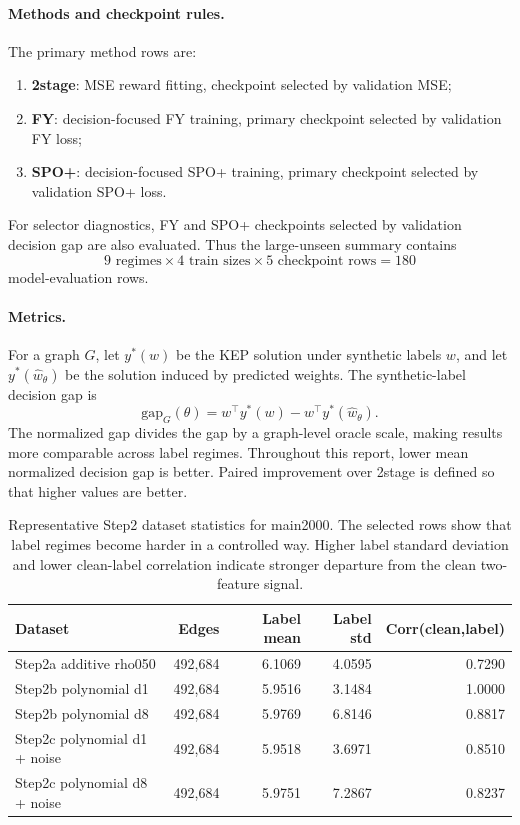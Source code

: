 \documentclass[11pt]{article}
\newcommand{\gap}{\mathrm{gap}}
\begin{document}
\paragraph{Methods and checkpoint rules.}
The primary method rows are:
\begin{enumerate}
  \item \textbf{2stage}: MSE reward fitting, checkpoint selected by validation MSE;
  \item \textbf{FY}: decision-focused FY training, primary checkpoint selected by validation FY loss;
  \item \textbf{SPO+}: decision-focused SPO+ training, primary checkpoint selected by validation SPO+ loss.
\end{enumerate}
For selector diagnostics, FY and SPO+ checkpoints selected by validation decision gap are also evaluated. Thus the large-unseen summary contains
\[
  9\text{ regimes}\times 4\text{ train sizes}\times 5\text{ checkpoint rows}=180
\]
model-evaluation rows.

\paragraph{Metrics.}
For a graph \(G\), let \(y^*(w)\) be the KEP solution under synthetic labels \(w\), and let \(y^*(\widehat w_\theta)\) be the solution induced by predicted weights. The synthetic-label decision gap is
\[
  \gap_G(\theta) = w^\top y^*(w) - w^\top y^*(\widehat w_\theta).
\]
The normalized gap divides the gap by a graph-level oracle scale, making results more comparable across label regimes. Throughout this report, lower mean normalized decision gap is better. Paired improvement over 2stage is defined so that higher values are better.

\begin{table}[H]
\centering
\caption{Representative Step2 dataset statistics for main2000. The selected rows show that label regimes become harder in a controlled way. Higher label standard deviation and lower clean-label correlation indicate stronger departure from the clean two-feature signal.}
\label{tab:label-qa}
\begin{tabular}{lrrrr}
\toprule
Dataset & Edges & Label mean & Label std & Corr(clean,label) \\
\midrule
Step2a additive rho050 & 492,684 & 6.1069 & 4.0595 & 0.7290 \\
Step2b polynomial d1 & 492,684 & 5.9516 & 3.1484 & 1.0000 \\
Step2b polynomial d8 & 492,684 & 5.9769 & 6.8146 & 0.8817 \\
Step2c polynomial d1 + noise & 492,684 & 5.9518 & 3.6971 & 0.8510 \\
Step2c polynomial d8 + noise & 492,684 & 5.9751 & 7.2867 & 0.8237 \\
\bottomrule
\end{tabular}
\end{table}
\end{document}

